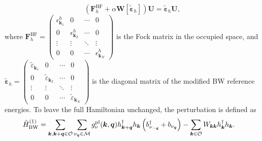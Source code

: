 \begin{equation}
    \left(\mathbf{F}_{h}^{\mathrm{HF}}+\alpha \mathbf{W}[\bm{\tilde{\varepsilon}}_h]\right) \bm{U} = \bm{\tilde{\varepsilon}}_h \bm{U},
\end{equation}
where $\mathbf{F}_{h}^{\mathrm{HF}}=\begin{pmatrix}
\epsilon_{\bm{k}_1}^{h} & 0 & \cdots & 0 \\
0 & \epsilon_{\bm{k}_2}^{h} & \cdots & 0 \\
\vdots & \vdots & \ddots & \vdots \\
0 & 0 & \cdots & \epsilon_{\bm{k}_N}^{h}
\end{pmatrix}$ is the Fock matrix in the occupied space, and $\bm{\tilde{\varepsilon}}_h = \begin{pmatrix}\tilde{\varepsilon}_{\bm{k}_1} & 0 & \cdots & 0 \\
0 & \tilde{\varepsilon}_{\bm{k}_2} & \cdots & 0 \\
\vdots & \vdots & \ddots & \vdots \\
0 & 0 & \cdots & \tilde{\varepsilon}_{\bm{k}_N}
\end{pmatrix}$ is the diagonal matrix of the modified BW reference energies. 
To leave the full Hamiltonian unchanged, the perturbation is defined as
\begin{align}
\hat{H}_{\mathrm{BW}}^{(1)}
&=
\sum_{\bm{k},\bm{k}+\bm{q}\in\mathcal{O}}
\sum_{\nu_{\bm{q}}\in\mathcal{M}}
g_{\nu}^{\rm pl}(\bm{k},\bm{q})
h_{\bm{k}+\bm{q}}^{\dagger}
h_{\bm{k}}
\left(
b_{\nu_{-\bm{q}}}^{\dagger}
+
b_{\nu_{\bm{q}}}
\right)
-
\sum_{\bm{k}\in\mathcal{O}}
W_{\bm{k}\bm{k}}
h_{\bm{k}}^\dagger h_{\bm{k}}.
\end{align}
